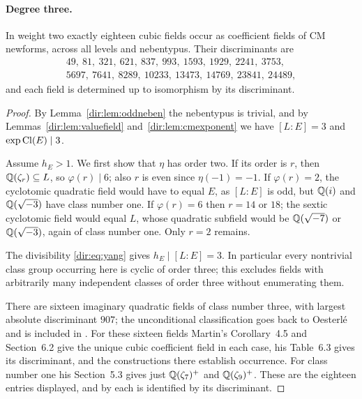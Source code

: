 \paragraph{Degree three.}

\begin{theorem}\label{dir:thm:cmcubic}
In weight two exactly eighteen cubic fields occur as coefficient fields of CM
newforms, across all levels and nebentypus. Their discriminants are
\[
\begin{gathered}
49,\ 81,\ 321,\ 621,\ 837,\ 993,\ 1593,\ 1929,\ 2241,\ 3753,\\
5697,\ 7641,\ 8289,\ 10233,\ 13473,\ 14769,\ 23841,\ 24489 ,
\end{gathered}
\]
and each field is determined up to isomorphism by its discriminant.
\end{theorem}

\begin{proof}
By Lemma~\ref{dir:lem:oddneben} the nebentypus is trivial, and by
Lemmas~\ref{dir:lem:valuefield} and~\ref{dir:lem:cmexponent} we have $[L:E]=3$ and
$\exp\operatorname{Cl}(E)\mid3$.

Assume $h_E>1$. We first show that $\eta$ has order two. If its order is $r$, then
$\mathbb{Q}(\zeta_r)\subseteq L$, so $\varphi(r)\mid6$; also $r$ is even since $\eta(-1)=-1$.
If $\varphi(r)=2$, the cyclotomic quadratic field would have to equal $E$, as $[L:E]$
is odd, but $\mathbb{Q}(i)$ and $\mathbb{Q}(\sqrt{-3})$ have class number one. If $\varphi(r)=6$ then
$r=14$ or $18$; the sextic cyclotomic field would equal $L$, whose quadratic subfield
would be $\mathbb{Q}(\sqrt{-7})$ or $\mathbb{Q}(\sqrt{-3})$, again of class number one. Only $r=2$
remains.

The divisibility \eqref{dir:eq:yang} gives $h_E\mid[L:E]=3$. In particular every
nontrivial class group occurring here is cyclic of order three; this excludes fields
with arbitrarily many independent classes of order three without enumerating them.

There are sixteen imaginary quadratic fields of class number three, with largest
absolute discriminant $907$; the unconditional classification goes back to Oesterl\'e
and is included in \cite{Watkins2004Class}. For these sixteen fields Martin's
Corollary~4.5 and Section~6.2 give the unique cubic coefficient field in each case,
his Table~6.3 gives its discriminant, and the constructions there establish
occurrence. For class number one his Section~5.3 gives just $\mathbb{Q}(\zeta_7)^+$ and
$\mathbb{Q}(\zeta_9)^+$. These are the eighteen entries displayed, and by
\cite[Table~1.2]{Martin2025Rationality} each is identified by its discriminant.
\end{proof}

